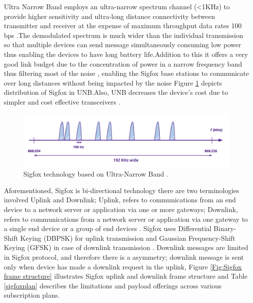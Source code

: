 \documentclass[12pt]{article}
\begin{document}
Ultra Narrow Band employs an ultra-narrow spectrum channel (<1KHz) to provide higher sensitivity and ultra-long distance connectivity between transmitter and receiver at the expense of maximum throughput data rates 100 bps \cite{raza2017low,bardyn2016iot,mekki2019comparative}.The demodulated spectrum is much wider than the individual transmission so that multiple devices can send message simultaneously consuming low power thus enabling the devices to have long battery life.Addition to this it offers a very good link budget due to the concentration of power in a narrow frequency band thus filtering most of the noise \cite{naik2018lpwan,7417420}, enabling the Sigfox base stations to communicate over long distances without being impacted by the noise \cite{SigfoxTechnicalDoc} Figure \ref{fig:Sigfox Technology based on UNB} depicts distribution of Sigfox in UNB.Also, UNB decreases the device's cost due to simpler and cost effective transceivers \cite{roth2018physical}.
\newline

\begin{figure}[H]
  \includegraphics[width=\textwidth]{Images/sigfox_unb.png}
  \centering
  \caption{Sigfox technology based on Ultra-Narrow Band  \cite{SigfoxTechnicalDoc}.}
  \label{fig:Sigfox Technology based on UNB}
\end{figure}

Aforementioned, Sigfox is bi-directional technology there are two terminologies involved Uplink and Downlink; Uplink, refers to communications from an end device to a network server or application via one or more gateways; Downlink, refers to communications from a network server or application via one gateway to a single end device or a group of end devices \cite{farrell2018low}. Sigfox uses Differential Binary-Shift Keying (DBPSK) for uplink transmission and Gaussian Frequency-Shift Keying (GFSK) in case of downlink transmission \cite{explainingSigfox}. Downlink messages are limited in Sigfox protocol, and therefore there is a asymmetry; downlink message is sent only when device has made a downlink request in the uplink, Figure \ref{Fig:Sigfox frame structure} illustrates Sigfox uplink and downlink frame structure and Table \ref{sigfoxplan} describes the limitations and payload offerings across various subscription plans.
\end{document}
